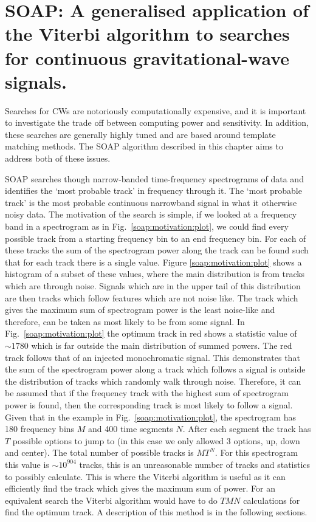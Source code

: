 \chapter[SOAP for CW searches.]{\label{soap} SOAP: A generalised application of the Viterbi algorithm to searches for continuous gravitational-wave signals.}

Searches for \glspl{CW} are notoriously computationally expensive, and it is important to investigate the trade off between computing power and sensitivity.
In addition, these searches are generally highly tuned and are based around template matching methods. The SOAP algorithm described in this chapter aims to address both of these issues.

SOAP searches though narrow-banded time-frequency spectrograms of data and identifies the `most probable track' in frequency through it.  The `most probable track' is the most probable continuous narrowband signal in what it otherwise noisy data.  
The motivation of the search is simple, if we looked at a frequency band in a
spectrogram as in Fig.~\ref{soap:motivation:plot}, we could find every possible track from a starting frequency bin to an end frequency bin.
For each of these tracks the sum of the spectrogram power along the track can
be found such that for each track there is a single value.
Figure \ref{soap:motivation:plot} shows a histogram of a subset of these values, where the main distribution is from tracks which are through noise.
Signals which are in the upper tail of this distribution are then tracks which follow features which are not noise like.
The track which gives the maximum sum of spectrogram power is the least noise-like and therefore, can be taken as most likely to be from some signal.
In Fig.~\ref{soap:motivation:plot} the optimum track in red shows a
statistic value of $\sim 1780$ which is far outside the main distribution of
summed powers.  The red track follows that of an injected monochromatic signal.  This
demonstrates that the sum of the spectrogram power along a track which follows
a signal is outside the distribution of tracks which randomly walk through noise.
Therefore, it can be assumed that if the frequency track with the highest sum
of spectrogram power is found, then the corresponding track is most likely
to follow a signal.  Given that in the example in Fig.~\ref{soap:motivation:plot}, the
spectrogram has 180 frequency bins $M$ and 400 time segments $N$.
After each segment the track has $T$ possible options to jump to (in this case
we only allowed 3 options, up, down and center). The total number of possible tracks is $MT^{N}$.
For this spectrogram this value is $\sim 10^{904}$ tracks, this is an unreasonable
number of tracks and statistics to possibly calculate. This is where the Viterbi algorithm
\citep{viterbi1967ErrorBounds} is useful as it can efficiently find the track
which gives the maximum sum of power. For an equivalent search the Viterbi
algorithm would have to do $TMN$ calculations for find the optimum track. A description of this method is in the following sections.

